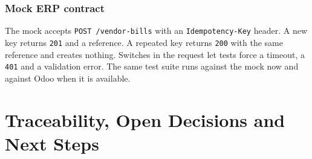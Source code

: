 \subsection{Mock ERP contract}
The mock accepts \texttt{POST /vendor-bills} with an \texttt{Idempotency-Key} header. A new key returns \texttt{201} and a reference. A repeated key returns \texttt{200} with the same reference and creates nothing. Switches in the request let tests force a timeout, a \texttt{401} and a validation error. The same test suite runs against the mock now and against Odoo when it is available.

\chapter{Traceability, Open Decisions and Next Steps}\label{ch:p2trace}
